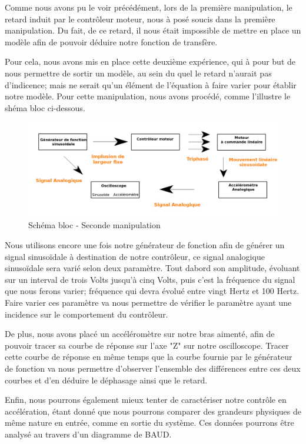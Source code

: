 \documentclass[french,a4paper,12pt]{report}
\begin{document}
		Comme nous avons pu le voir précédément, lors de la première manipulation, le retard induit par le contrôleur moteur, nous à posé soucis dans la première manipulation. Du fait, de ce retard, il nous était impossible de mettre en place un modèle afin de pouvoir déduire notre fonction de transfère.
		
		Pour cela, nous avons mis en place cette deuxième expérience, qui à pour but de nous permettre de sortir un modèle, au sein du quel le retard n'aurait pas d'indicence; mais ne serait qu'un élément de l'équation à faire varier pour établir notre modèle. Pour cette manipulation, nous avons procédé, comme l'illustre le shéma bloc ci-dessous.		
		
	\begin{figure}[!ht]
    \center
  	\includegraphics[width=18cm]{manip2.png}
    \caption{Schéma bloc - Seconde manipulation}
	\end{figure}	
	
	Nous utilisons encore une fois notre générateur de fonction afin de générer un signal sinusoïdale à destination de notre contrôleur, ce signal analogique sinusoïdale sera varié selon deux paramètre. Tout dabord son amplitude, évoluant sur un interval de trois Volts jusqu'à cinq Volts, puis c'est la fréquence du signal que nous ferons varier; fréquence qui devra évolué entre vingt Hertz et 100 Hertz.	Faire varier ces paramètre va nous permettre de vérifier le paramètre ayant une incidence sur le comportement du contrôleur.
	
	De plus, nous avons placé un accéléromètre sur notre bras aimenté, afin de pouvoir tracer sa courbe de réponse sur l'axe "Z" sur notre oscilloscope. Tracer cette courbe de réponse en même temps que la courbe fournie par le générateur de fonction va nous permettre d'observer l'ensemble des différences entre ces deux courbes et d'en déduire le déphasage ainsi que le retard.
	
	Enfin, nous pourrons également mieux tenter de caractériser notre contrôle en accélération, étant donné que nous pourrons comparer des grandeurs physiques de même nature en entrée, comme en sortie du système. Ces données pourrons être analysé au travers d'un diagramme de BAUD.
	
\end{document}
